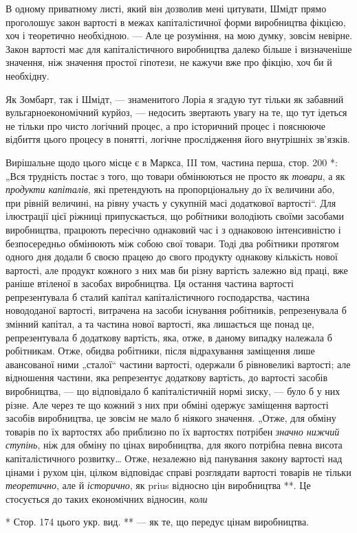 \parcont{}  %
В одному приватному листі, який він дозволив мені цитувати, Шмідт прямо проголошує закон вартості в межах капіталістичної форми
виробництва фікцією, хоч і теоретично необхідною. — Але це розуміння, на мою думку, зовсім невірне. Закон вартості має для
капіталістичного виробництва далеко більше і визначеніше значення, ніж значення простої гіпотези, не кажучи вже про фікцію,
хоч би й необхідну.

Як Зомбарт, так і Шмідт, — знаменитого Лоріа я згадую тут тільки як забавний вульгарноекономічний
курйоз, — недосить звертають увагу на те, що тут ідеться не тільки про чисто логічний процес, а про історичний процес і
пояснююче відбиття цього процесу в понятті, логічне прослідження його внутрішніх зв’язків.

Вирішальне щодо цього місце є в
Маркса, III том, частина перша, стор. 200 *: „Вся трудність постає з того, що товари обмінюються не просто як \emph{товари}, а як
\emph{продукти капіталів}, які претендують на пропорціональну до їх величини або, при рівній величині, на рівну участь у сукупній
масі додаткової вартості“.  Для ілюстрації цієї ріжниці припускається, що робітники володіють своїми засобами виробництва,
працюють пересічно однаковий час і з однаковою інтенсивністю і безпосередньо обмінюють між собою свої товари. Тоді два
робітники протягом одного дня додали б своєю працею до свого продукту однакову кількість нової вартості, але продукт кожного
з них мав би різну вартість залежно від праці, вже раніше втіленої в засобах виробництва. Ця остання частина вартості
репрезентувала б сталий капітал капіталістичного господарства, частина новододаної вартості, витрачена на засоби існування
робітників, репрезенувала б змінний капітал, а та частина нової вартості, яка лишається ще понад це, репрезентувала б
додаткову вартість, яка, отже, в даному випадку належала б робітникам. Отже, обидва робітники, після відрахування заміщення
лише авансованої ними „сталої“ частини вартості, одержали б рівновеликі вартості; але відношення частини, яка репрезентує
додаткову вартість, до
вартості засобів виробництва, — що відповідало б капіталістичній нормі зиску, — було б у них різне. Але через те що кожний з них
при обміні одержує заміщення вартості засобів виробництва, це зовсім не мало б ніякого значення. „Отже, для обміну
товарів по їх вартостях або приблизно по їх вартостях потрібен \emph{значно нижчий ступінь}, ніж для обміну по цінах виробництва,
для якого потрібна певна висота капіталістичного розвитку\dots{} Отже, незалежно від панування закону вартості над цінами і
рухом цін, цілком відповідає справі розглядати вартості товарів не тільки \emph{теоретично}, але й \emph{історично}, як prius відносно цін
виробництва **. Це стосується до таких економічних відносин, \emph{коли}

* Стор. 174 цього укр. вид. 
** — як те, що передує цінам виробництва. 
\parbreak{}  %
